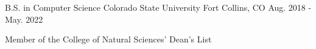 

\begin{cventries}

  \cventry
    {B.S. in Computer Science } %
    {Colorado State University} %
    {Fort Collins, CO} %
    {Aug. 2018 - May. 2022} %
    {
      \begin{cvitems} %
        \item {Member of the College of Natural Sciences’ Dean’s List}
      \end{cvitems}
    }

\end{cventries}

